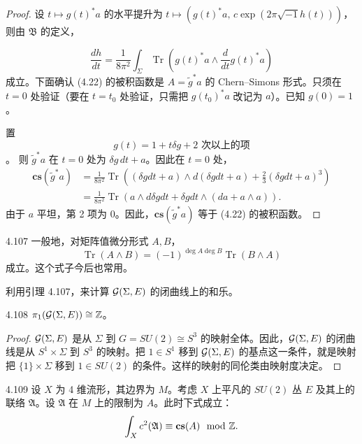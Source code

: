 \begin{proof}
  设 $t\mapsto g(t)^*a$ 的水平提升为 $t\mapsto(g(t)^*a,\,c\exp(2\pi\sqrt{-1}h(t)))$，则由 $\mathfrak{B}$ 的定义，

  \begin{equation}
    \frac{dh}{dt}=\frac{1}{8\pi^2}\int_\Sigma\operatorname{Tr}\left(g(t)^*a\wedge\frac{d}{dt}g(t)^*a\right) \tag{4.22}
  \end{equation}
  成立。下面确认 (4.22) 的被积函数是 $A=\tilde g^*a$ 的 Chern–Simons 形式。只须在 $t=0$ 处验证（要在 $t=t_0$ 处验证，只需把 $g(t_0)^*a$ 改记为 $a$）。已知 $g(0)=1$。

  置
  \[
    g(t)=1+t\delta g+2\text{ 次以上的项}
  \]。
  则 $\tilde g^*a$ 在 $t=0$ 处为 $\delta g\,dt+a$。因此在 $t=0$ 处，
  \begin{align*}
    \mathbf{cs}(\tilde g^*a)
    &=\frac{1}{8\pi^2}\operatorname{Tr}\left((\delta gdt+a)\wedge d(\delta gdt+a)+\frac{2}{3}(\delta gdt+a)^3\right)\\
    &=\frac{1}{8\pi^2}\operatorname{Tr}(a\wedge d\delta gdt+\delta gdt\wedge(da+a\wedge a)).
  \end{align*}
  由于 $a$ 平坦，第 2 项为 0。因此，$\mathbf{cs}(\tilde g^*a)$ 等于 (4.22) 的被积函数。
\end{proof}

\begin{remark}{4.107}
  一般地，对矩阵值微分形式 $A,B$，
  \[
    \operatorname{Tr}(A\wedge B)=(-1)^{\deg A\deg B}\operatorname{Tr}(B\wedge A)
  \]
  成立。这个式子今后也常用。
\end{remark}

利用引理 4.107，来计算 $\mathcal{G}(\Sigma,E)$ 的闭曲线上的和乐。

\begin{lemma*}{4.108}
  $\pi_1(\mathcal{G}(\Sigma,E))\cong\mathbb{Z}$。
\end{lemma*}

\begin{proof}
  $\mathcal{G}(\Sigma,E)$ 是从 $\Sigma$ 到 $G=SU(2)\cong S^3$ 的映射全体。因此，$\mathcal{G}(\Sigma,E)$ 的闭曲线是从 $S^1\times\Sigma$ 到 $S^3$ 的映射。把 $1\in S^1$ 移到 $\mathcal{G}(\Sigma,E)$ 的基点这一条件，就是映射把 $\{1\}\times\Sigma$ 移到 $1\in SU(2)$ 的条件。这样的映射的同伦类由映射度决定。
\end{proof}

\begin{lemma*}{4.109}
  设 $X$ 为 4 维流形，其边界为 $M$。考虑 $X$ 上平凡的 $SU(2)$ 丛 $E$ 及其上的联络 $\mathfrak{A}$。设 $\mathfrak{A}$ 在 $M$ 上的限制为 $A$。此时下式成立：
  \[
    \int_X c^2(\mathfrak{A})\equiv\mathbf{cs}(A)\mod{\mathbb{Z}}.
  \]
\end{lemma*}

